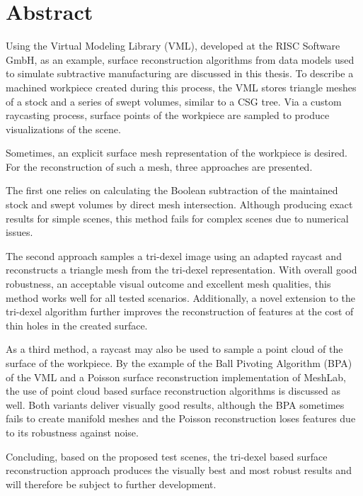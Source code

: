 \pagebreak

\chapter*{Abstract}

Using the Virtual Modeling Library (VML), developed at the RISC Software GmbH, as an example, surface reconstruction algorithms from data models used to simulate subtractive manufacturing are discussed in this thesis.
To describe a machined workpiece created during this process, the VML stores triangle meshes of a stock and a series of swept volumes, similar to a CSG tree.
Via a custom raycasting process, surface points of the workpiece are sampled to produce visualizations of the scene.

Sometimes, an explicit surface mesh representation of the workpiece is desired.
For the reconstruction of such a mesh, three approaches are presented.

The first one relies on calculating the Boolean subtraction of the maintained stock and swept volumes by direct mesh intersection.
Although producing exact results for simple scenes, this method fails for complex scenes due to numerical issues.

The second approach samples a tri-dexel image using an adapted raycast and reconstructs a triangle mesh from the tri-dexel representation.
With overall good robustness, an acceptable visual outcome and excellent mesh qualities, this method works well for all tested scenarios.
Additionally, a novel extension to the tri-dexel algorithm further improves the reconstruction of features at the cost of thin holes in the created surface.

As a third method, a raycast may also be used to sample a point cloud of the surface of the workpiece.
By the example of the Ball Pivoting Algorithm (BPA) of the VML and a Poisson surface reconstruction implementation of MeshLab, the use of point cloud based surface reconstruction algorithms is discussed as well.
Both variants deliver visually good results, although the BPA sometimes fails to create manifold meshes and the Poisson reconstruction loses features due to its robustness against noise.

Concluding, based on the proposed test scenes, the tri-dexel based surface reconstruction approach produces the visually best and most robust results and will therefore be subject to further development.
